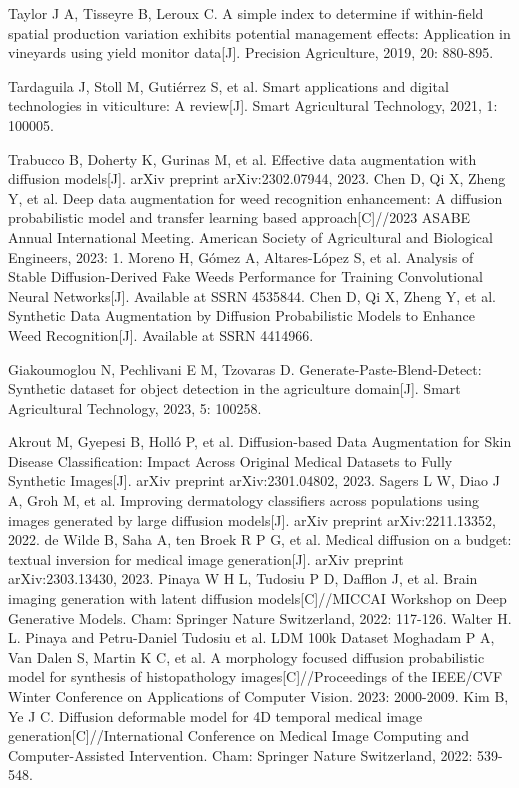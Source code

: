\documentclass[preprint,12pt,authoryear]{elsarticle}
\begin{document}
\begin{thebibliography}{00}
 Taylor J A, Tisseyre B, Leroux C. A simple index to determine if within-field spatial production variation exhibits potential management effects: Application in vineyards using yield monitor data[J]. Precision Agriculture, 2019, 20: 880-895.

 Tardaguila J, Stoll M, Gutiérrez S, et al. Smart applications and digital technologies in viticulture: A review[J]. Smart Agricultural Technology, 2021, 1: 100005.

 Trabucco B, Doherty K, Gurinas M, et al. Effective data augmentation with diffusion models[J]. arXiv preprint arXiv:2302.07944, 2023.
 Chen D, Qi X, Zheng Y, et al. Deep data augmentation for weed recognition enhancement: A diffusion probabilistic model and transfer learning based approach[C]//2023 ASABE Annual International Meeting. American Society of Agricultural and Biological Engineers, 2023: 1.
 Moreno H, Gómez A, Altares-López S, et al. Analysis of Stable Diffusion-Derived Fake Weeds Performance for Training Convolutional Neural Networks[J]. Available at SSRN 4535844.
 Chen D, Qi X, Zheng Y, et al. Synthetic Data Augmentation by Diffusion Probabilistic Models to Enhance Weed Recognition[J]. Available at SSRN 4414966.

 Giakoumoglou N, Pechlivani E M, Tzovaras D. Generate-Paste-Blend-Detect: Synthetic dataset for object detection in the agriculture domain[J]. Smart Agricultural Technology, 2023, 5: 100258.

 Akrout M, Gyepesi B, Holló P, et al. Diffusion-based Data Augmentation for Skin Disease Classification: Impact Across Original Medical Datasets to Fully Synthetic Images[J]. arXiv preprint arXiv:2301.04802, 2023.
 Sagers L W, Diao J A, Groh M, et al. Improving dermatology classifiers across populations using images generated by large diffusion models[J]. arXiv preprint arXiv:2211.13352, 2022.
 de Wilde B, Saha A, ten Broek R P G, et al. Medical diffusion on a budget: textual inversion for medical image generation[J]. arXiv preprint arXiv:2303.13430, 2023.
 Pinaya W H L, Tudosiu P D, Dafflon J, et al. Brain imaging generation with latent diffusion models[C]//MICCAI Workshop on Deep Generative Models. Cham: Springer Nature Switzerland, 2022: 117-126.
 Walter H. L. Pinaya and Petru-Daniel Tudosiu et al. LDM 100k Dataset
 Moghadam P A, Van Dalen S, Martin K C, et al. A morphology focused diffusion probabilistic model for synthesis of histopathology images[C]//Proceedings of the IEEE/CVF Winter Conference on Applications of Computer Vision. 2023: 2000-2009.
 Kim B, Ye J C. Diffusion deformable model for 4D temporal medical image generation[C]//International Conference on Medical Image Computing and Computer-Assisted Intervention. Cham: Springer Nature Switzerland, 2022: 539-548.


\end{thebibliography}
\end{document}
